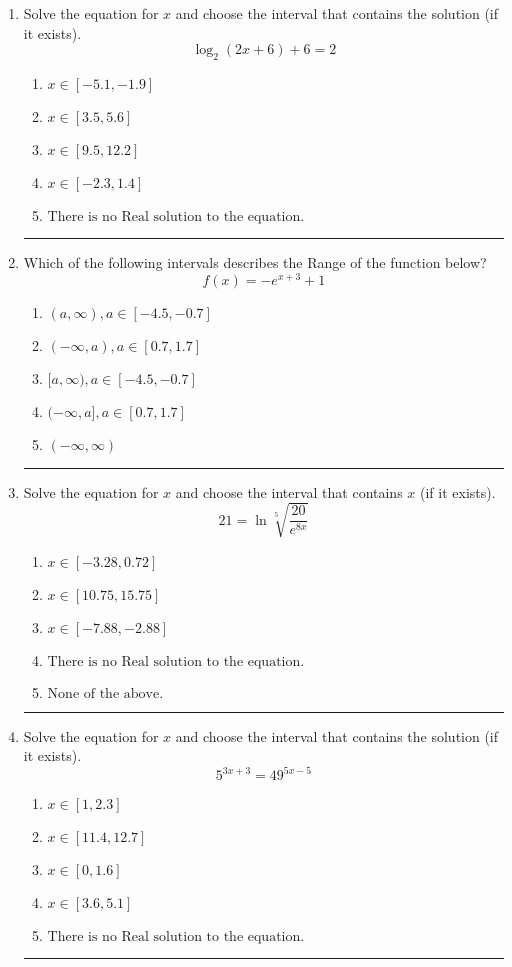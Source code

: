 \documentclass[14pt]{extbook}
\newcommand{\litem}[1]{\item#1\hspace*{-1cm}\rule{\textwidth}{0.4pt}}
\begin{document}
\begin{enumerate}
\litem{
Solve the equation for $x$ and choose the interval that contains the solution (if it exists).\[ \log_{2}{(2x+6)}+6 = 2 \]\begin{enumerate}[label=\Alph*.]
\item \( x \in [-5.1, -1.9] \)
\item \( x \in [3.5, 5.6] \)
\item \( x \in [9.5, 12.2] \)
\item \( x \in [-2.3, 1.4] \)
\item \( \text{There is no Real solution to the equation.} \)

\end{enumerate} }
\litem{
Which of the following intervals describes the Range of the function below?\[ f(x) = -e^{x+3}+1 \]\begin{enumerate}[label=\Alph*.]
\item \( (a, \infty), a \in [-4.5, -0.7] \)
\item \( (-\infty, a), a \in [0.7, 1.7] \)
\item \( [a, \infty), a \in [-4.5, -0.7] \)
\item \( (-\infty, a], a \in [0.7, 1.7] \)
\item \( (-\infty, \infty) \)

\end{enumerate} }
\litem{
 Solve the equation for $x$ and choose the interval that contains $x$ (if it exists).\[  21 = \ln{\sqrt[5]{\frac{20}{e^{8x}}}} \]\begin{enumerate}[label=\Alph*.]
\item \( x \in [-3.28, 0.72] \)
\item \( x \in [10.75, 15.75] \)
\item \( x \in [-7.88, -2.88] \)
\item \( \text{There is no Real solution to the equation.} \)
\item \( \text{None of the above.} \)

\end{enumerate} }
\litem{
Solve the equation for $x$ and choose the interval that contains the solution (if it exists).\[ 5^{3x+3} = 49^{5x-5} \]\begin{enumerate}[label=\Alph*.]
\item \( x \in [1, 2.3] \)
\item \( x \in [11.4, 12.7] \)
\item \( x \in [0, 1.6] \)
\item \( x \in [3.6, 5.1] \)
\item \( \text{There is no Real solution to the equation.} \)


\end{enumerate}}
\end{enumerate}
\end{document}
